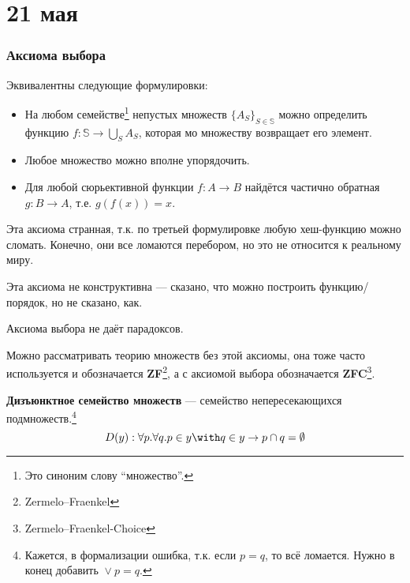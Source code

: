 \chapter{21 мая}

\subsection{Аксиома выбора}

\begin{axiom}
    Эквивалентны следующие формулировки:
    \begin{itemize}
        \item На любом семействе\footnote{Это синоним слову ``множество''.} непустых множеств \(\{A_S\}_{S \in \mathbb{S}}\) можно определить функцию \(f : \mathbb{S} \to \bigcup_S A_S\), которая мо множеству возвращает его элемент.
        \item Любое множество можно вполне упорядочить.
        \item Для любой сюрьективной функции \(f : A \to B\) найдётся частично обратная \(g : B \to A\), т.е. \(g(f(x)) = x\).
    \end{itemize}
\end{axiom}

\begin{remark}
    Эта аксиома странная, т.к. по третьей формулировке любую хеш-функцию можно сломать. Конечно, они все ломаются перебором, но это не относится к реальному миру.
\end{remark}

\begin{remark}
    Эта аксиома не конструктивна --- сказано, что можно построить функцию/порядок, но не сказано, как.
\end{remark}

\begin{remark}
    Аксиома выбора не даёт парадоксов.
\end{remark}

\begin{remark}
    Можно рассматривать теорию множеств без этой аксиомы, она тоже часто используется и обозначается \textbf{ZF}\footnote{Zermelo–Fraenkel}, а с аксиомой выбора обозначается \textbf{ZFC}\footnote{Zermelo–Fraenkel-Choice}.
\end{remark}

\begin{definition}
    \textbf{Дизъюнктное семейство множеств} --- семейство непересекающихся подмножеств.\footnote{Кажется, в формализации ошибка, т.к. если \(p = q\), то всё ломается. Нужно в конец добавить \({}\lor p = q\).}
    \[D(y) : \forall p.\forall q.p \in y \with q \in y \to p \cap q = \emptyset\]
\end{definition}


